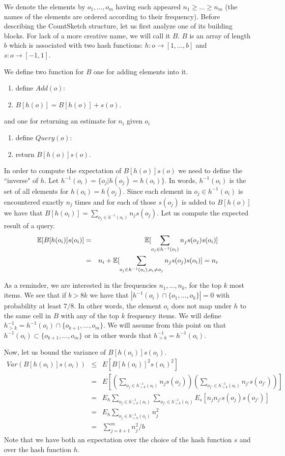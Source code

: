 We denote the elements by $o_1,\ldots,o_m$ having each appeared $n_1 \ge \ldots \ge n_m$
(the names of the elements are ordered according to their frequency).
Before describing the CountSketch structure, let us first analyze one of its building blocks.
For lack of a more creative name, we will call it $B$.
$B$ is an array of length $b$ which is associated with two hash functions:
$h: o \rightarrow [1,\ldots,b]$ and $s: o \rightarrow [-1,1]$.
  
We define two function for $B$ one for adding elements into it.
\begin{enumerate}
\item define $Add(o)$:
\item \tab $B[h(o)] = B[h(o)] + s(o)$. 
\end{enumerate} 
and one for returning an estimate for $n_i$ given $o_i$
\begin{enumerate}
\item define $Query(o)$:
\item \tab return $B[h(o)]s(o)$. 
\end{enumerate} 

In order to compute the expectation of $B[h(o)]s(o)$ we need to define the ``inverse" of $h$. 
Let $h^{-1}(o_i) = \{o_j | h(o_j) = h(o_i)\}$. In words, $h^{-1}(o_i)$ is the set of all elements for $h(o_i)=h(o_j)$.
Since each element in $o_j \in h^{-1}(o_i)$ is encountered exactly $n_j$ times and for each of those $s(o_j)$ is added to $B[h(o)]$
we have that $B[h(o_i)] = \sum_{o_j \in h^{-1}(o_i)} n_j s(o_j)$. Let us compute the expected result of a query.
\begin{eqnarray*}
{\mathbb E}[B[h(o_i)]s(o_i)] &=& {\mathbb E}[\sum_{o_j \in h^{-1}(o_i)} n_j s(o_j)s(o_i)] \\
&=& n_i + {\mathbb E}[\sum_{o_j \in h^{-1}(o_i),o_i \ne o_j} n_j s(o_j)s(o_i)] = n_i
\end{eqnarray*}

As a reminder, we are interested in the frequencies $n_1,\ldots,n_k$, for the top $k$ most items.
We see that if $b > 8k$ we have that $|h^{-1}(o_i)\cap\{o_1,\ldots,o_k\} |=0$ with probability at least $7/8$.
In other words, the element $o_i$ does not map under $h$ to the same cell in $B$ with any of the top $k$ frequency items.
We will define $h^{-1}_{>k} = h^{-1}(o_i)\cap\{o_{k+1},\ldots,o_m\}$.
We will assume from this point on that $h^{-1}(o_i) \subset \{o_{k+1},\ldots,o_m\}$ or in other words that $h^{-1}_{>k} = h^{-1}(o_i)$.

Now, let us bound the variance of $B[h(o_i)]s(o_i)$.
\begin{eqnarray*}
Var(B[h(o_i)]s(o_i)) &\le & E[B[h(o_i)]^2 s(o_i)^2] \\
&=& E[(\sum_{o_j \in h^{-1}_{>k}(o_i)} n_j s(o_j))(\sum_{o_{j'} \in h^{-1}_{>k}(o_i)} n_{j'} s(o_{j'}))]\\
&= & E_h \sum_{o_j \in h^{-1}_{>k}(o_i)} \sum_{o_{j'} \in h^{-1}_{>k}(o_i)} E_s [n_j n_{j'} s(o_j) s(o_{j'}) ]\\
&= &E_h  \sum_{o_j \in h^{-1}_{>k}(o_i)}n^2_j \\
&= &\sum_{j = k+1}^{m}n^2_j / b
\end{eqnarray*}
Note that we have both an expectation over the choice of the hash function $s$ and over the hash function $h$.

